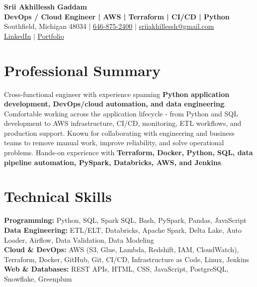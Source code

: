 \documentclass[letterpaper,10pt]{article}
\begin{document}
\fontsize{9.35pt}{10.45pt}\selectfont

\begin{center}
    {\LARGE \textbf{Srii Akhillessh Gaddam}} \\[-1pt]
    \textbf{DevOps / Cloud Engineer | AWS | Terraform | CI/CD | Python} \\[2pt]
    Southfield, Michigan 48034 $|$
    \href{tel:6468752400}{646-875-2400} $|$
    \href{mailto:sriiakhillessh@gmail.com}{sriiakhillessh@gmail.com} \\[1pt]
    \href{https://www.linkedin.com/in/srii-akhiilessh-gaddam-b48668191/}{LinkedIn} $|$
    \href{https://sriiakhillesshg.github.io/portfolio/}{Portfolio}
\end{center}
\vspace{-8pt}

\section{Professional Summary}
\small{Cross-functional engineer with experience spanning \textbf{Python application development, DevOps/cloud automation, and data engineering}. Comfortable working across the application lifecycle - from Python and SQL development to AWS infrastructure, CI/CD, monitoring, ETL workflows, and production support. Known for collaborating with engineering and business teams to remove manual work, improve reliability, and solve operational problems. Hands-on experience with \textbf{Terraform, Docker, Python, SQL, data pipeline automation, PySpark, Databricks, AWS, and Jenkins}.}

\section{Technical Skills}
\small{
\textbf{Programming:} Python, SQL, Spark SQL, Bash, PySpark, Pandas, JavaScript \\
\textbf{Data Engineering:} ETL/ELT, Databricks, Apache Spark, Delta Lake, Auto Loader, Airflow, Data Validation, Data Modeling \\
\textbf{Cloud \& DevOps:} AWS (S3, Glue, Lambda, Redshift, IAM, CloudWatch), Terraform, Docker, GitHub, Git, CI/CD, Infrastructure as Code, Linux, Jenkins \\
\textbf{Web \& Databases:} REST APIs, HTML, CSS, JavaScript, PostgreSQL, Snowflake, Greenplum
}
\end{document}
